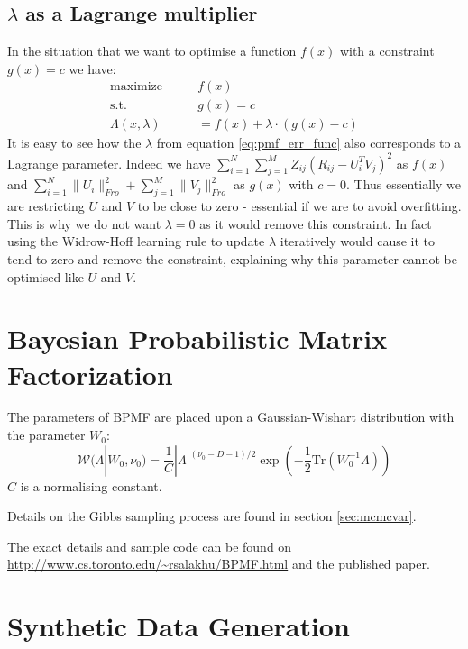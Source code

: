 \subsection{$\lambda$ as a Lagrange multiplier}
\label{sec:lag_lambd_optim}
In the situation that we want to optimise a function $f(x)$ with a constraint $g(x)=c$ we have:
\begin{align*}
\text{maximize} \qquad & f(x) \\
\text{s.t.} \qquad & g(x)=c \\
\Lambda(x,\lambda) &= f(x) + \lambda \cdot \left(g(x)-c\right)
\end{align*}
It is easy to see how the $\lambda$ from equation \ref{eq:pmf_err_func} also corresponds to a Lagrange parameter. Indeed we have $\sum_{i=1}^{N} \sum_{j=1}^{M} Z_{ij}(R_{ij}-U_i^TV_j)^2$ as $f(x)$ and $\sum_{i=1}^{N} \|U_i\|_{Fro}^2 +  \sum_{j=1}^{M} \|V_j\|_{Fro}^2$ as $g(x)$ with $c=0$. Thus essentially we are restricting $U$ and $V$ to be close to zero - essential if we are to avoid overfitting. This is why we do not want $\lambda = 0$ as it would remove this constraint. In fact using the Widrow-Hoff learning rule to update $\lambda$ iteratively would cause it to tend to zero and remove the constraint, explaining why this parameter cannot be optimised like $U$ and $V$.

\section{Bayesian Probabilistic Matrix Factorization}
\label{sec:app_bpmf}

The parameters of BPMF are placed upon a Gaussian-Wishart distribution  with the parameter $W_0$:
\begin{equation*}
\mathcal{W}(\Lambda| W_0,\nu_0) = \frac{1}{C} |\Lambda|^{(\nu_0-D-1)/2} \exp \left(-\frac{1}{2}\text{Tr}(W_0^{-1}\Lambda)\right)
\end{equation*}
$C$ is a normalising constant.

Details on the Gibbs sampling process are found in section \ref{sec:mcmcvar}.

The exact details and sample code can be found on \url{http://www.cs.toronto.edu/~rsalakhu/BPMF.html} and the published paper.

\section{Synthetic Data Generation}
\label{sec:app_synth_gen}

